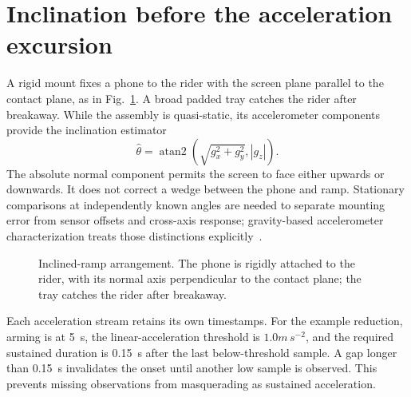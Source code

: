 \section{Inclination before the acceleration excursion}
A rigid mount fixes a phone to the rider with the screen plane parallel to the contact plane, as in Fig.~\ref{fig:static-friction-apparatus}. A broad padded tray catches the rider after breakaway. While the assembly is quasi-static, its accelerometer components provide the inclination estimator
\begin{equation}
 \hat\theta=\operatorname{atan2}\!\left(\sqrt{g_x^2+g_y^2},|g_z|\right).
 \label{eq:static-friction-angle}
\end{equation}
The absolute normal component permits the screen to face either upwards or downwards. It does not correct a wedge between the phone and ramp. Stationary comparisons at independently known angles are needed to separate mounting error from sensor offsets and cross-axis response; gravity-based accelerometer characterization treats those distinctions explicitly~\cite{geist2017}.

\begin{figure}[!b]
\centering
{}
\caption{Inclined-ramp arrangement. The phone is rigidly attached to the rider, with its normal axis perpendicular to the contact plane; the tray catches the rider after breakaway.}
\label{fig:static-friction-apparatus}
\end{figure}

Each acceleration stream retains its own timestamps. For the example reduction, arming is at 5~s, the linear-acceleration threshold is $1.0\unit{m\,s^{-2}}$, and the required sustained duration is 0.15~s after the last below-threshold sample. A gap longer than 0.15~s invalidates the onset until another low sample is observed. This prevents missing observations from masquerading as sustained acceleration.

